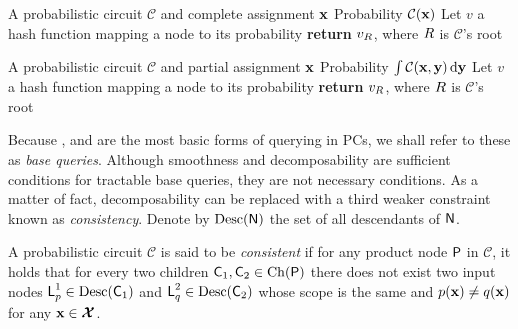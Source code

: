\begin{algorithm}[t]
  \caption{\evi}\label{alg:evi}
  \begin{algorithmic}[1]
    \Require A probabilistic circuit $\mathcal{C}$ and complete assignment $\mathbf{x}$
    \Ensure Probability $\mathcal{C}(\mathbf{x})$
    \State Let $v$ a hash function mapping a node to its probability
    \EndFor%
    \State \textbf{return} $v_{\normalfont{R}}$, where $\normalfont{R}$ is $\mathcal{C}$'s root
  \end{algorithmic}
\end{algorithm}
\begin{algorithm}[t]
  \caption{\mar}\label{alg:mar}
  \begin{algorithmic}[1]
    \Require A probabilistic circuit $\mathcal{C}$ and partial assignment $\mathbf{x}$
    \Ensure Probability $\int\mathcal{C}(\mathbf{x},\mathbf{y})\mathop{}\!\mathrm{d}\mathbf{y}$
    \State Let $v$ a hash function mapping a node to its probability
    \EndFor%
    \State \textbf{return} $v_{\normalfont{R}}$, where $\normalfont{R}$ is $\mathcal{C}$'s root
  \end{algorithmic}
\end{algorithm}

Because \evi{}, \mar{} and \con{} are the most basic forms of querying in PCs, we shall refer to
these as \emph{base queries}. Although smoothness and decomposability are sufficient conditions for
tractable base queries, they are not necessary conditions. As a matter of fact, decomposability can
be replaced with a third weaker constraint known as \emph{consistency}. Denote by $\operatorname*{\normalfont{Desc}}(\operatorname{\textsf{N}})$
the set of all descendants of $\operatorname{\textsf{N}}$.

\begin{definition}[Consistency]
  A probabilistic circuit $\mathcal{C}$ is said to be \emph{consistent} if for any product node
  $\operatorname{\textsf{P}}$ in $\mathcal{C}$, it holds that for every two children $\operatorname{\textsf{C}}_1,\operatorname{\textsf{C}}_2\in\operatorname*{\normalfont{Ch}}(\operatorname{\textsf{P}})$
  there does not exist two input nodes $\operatorname{\textsf{L}}_p^1\in\operatorname*{\normalfont{Desc}}(\operatorname{\textsf{C}}_1)$ and
  $\operatorname{\textsf{L}}_q^2\in\operatorname*{\normalfont{Desc}}(\operatorname{\textsf{C}}_2)$ whose scope is the same and $p(\mathbf{x})\neq q(\mathbf{x})$ for any
  $\mathbf{x}\in\bm{\mathcal{X}}$.
\end{definition}

